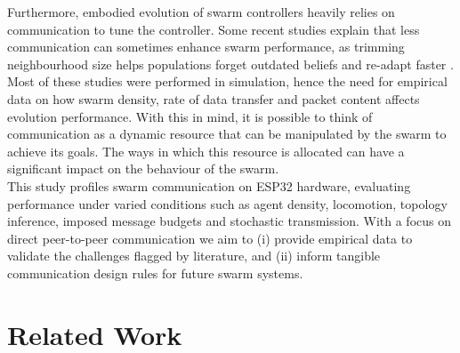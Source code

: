 \documentclass[conference]{IEEEtran}
\begin{document}
Furthermore, embodied evolution of swarm controllers heavily relies on communication to tune the controller. Some recent studies explain that less communication can sometimes enhance swarm performance, as trimming neighbourhood size helps populations forget outdated beliefs and re-adapt faster \cite{hiraga_when_2023}\cite{ding_advancements_2023}. Most of these studies were performed in simulation, hence the need for empirical data on how swarm density, rate of data transfer and packet content affects evolution performance. With this in mind, it is possible to think of communication as a dynamic resource that can be manipulated by the swarm to achieve its goals. The ways in which this resource is allocated can have a significant impact on the behaviour of the swarm.\\


This study profiles swarm communication on ESP32 hardware, evaluating performance under varied conditions such as agent density, locomotion, topology inference, imposed message budgets and stochastic transmission. With a focus on direct peer-to-peer communication  we aim to (i) provide empirical data to validate the challenges flagged by literature, and (ii) inform tangible communication design rules for future swarm systems.

\section{Related Work}


\end{document}
